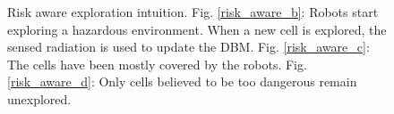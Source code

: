 \label{annexe: intuition}
\begin{figure}[htbp]
    \centering
    \hfill
    \hfill
        \caption{Risk aware exploration intuition. Fig. \ref{risk_aware_b}: Robots start exploring a hazardous environment. When a new cell is explored, the sensed radiation is used to update the DBM. Fig. \ref{risk_aware_c}: The cells have been mostly covered by the robots. Fig. \ref{risk_aware_d}: Only cells believed to be too dangerous remain unexplored.}
    \label{risk_aware}
\end{figure}

\label{annexe: argos}

